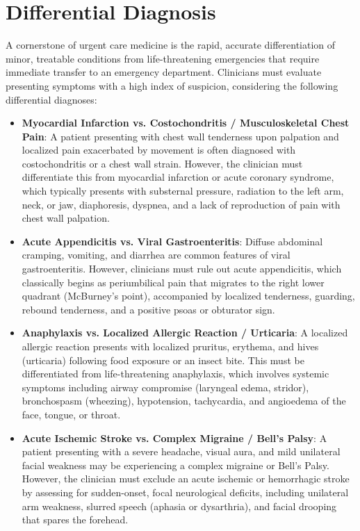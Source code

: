 \section*{Differential Diagnosis}
A cornerstone of urgent care medicine is the rapid, accurate differentiation of minor, treatable conditions from life-threatening emergencies that require immediate transfer to an emergency department. Clinicians must evaluate presenting symptoms with a high index of suspicion, considering the following differential diagnoses:

\begin{itemize}
  \item \textbf{Myocardial Infarction vs. Costochondritis / Musculoskeletal Chest Pain}: A patient presenting with chest wall tenderness upon palpation and localized pain exacerbated by movement is often diagnosed with costochondritis or a chest wall strain. However, the clinician must differentiate this from myocardial infarction or acute coronary syndrome, which typically presents with substernal pressure, radiation to the left arm, neck, or jaw, diaphoresis, dyspnea, and a lack of reproduction of pain with chest wall palpation.
  \item \textbf{Acute Appendicitis vs. Viral Gastroenteritis}: Diffuse abdominal cramping, vomiting, and diarrhea are common features of viral gastroenteritis. However, clinicians must rule out acute appendicitis, which classically begins as periumbilical pain that migrates to the right lower quadrant (McBurney's point), accompanied by localized tenderness, guarding, rebound tenderness, and a positive psoas or obturator sign.
  \item \textbf{Anaphylaxis vs. Localized Allergic Reaction / Urticaria}: A localized allergic reaction presents with localized pruritus, erythema, and hives (urticaria) following food exposure or an insect bite. This must be differentiated from life-threatening anaphylaxis, which involves systemic symptoms including airway compromise (laryngeal edema, stridor), bronchospasm (wheezing), hypotension, tachycardia, and angioedema of the face, tongue, or throat.
  \item \textbf{Acute Ischemic Stroke vs. Complex Migraine / Bell's Palsy}: A patient presenting with a severe headache, visual aura, and mild unilateral facial weakness may be experiencing a complex migraine or Bell's Palsy. However, the clinician must exclude an acute ischemic or hemorrhagic stroke by assessing for sudden-onset, focal neurological deficits, including unilateral arm weakness, slurred speech (aphasia or dysarthria), and facial drooping that spares the forehead.

\end{itemize}
